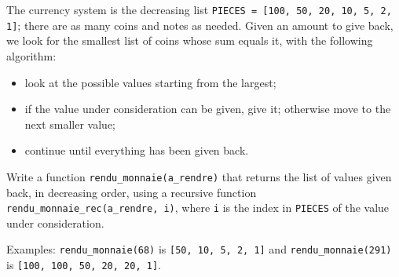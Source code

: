 The currency system is the decreasing list \texttt{PIECES = [100, 50, 20, 10, 5, 2, 1]}; there are as many coins and notes as needed. Given an amount to give back, we look for the smallest list of coins whose sum equals it, with the following algorithm:
\begin{itemize}
\item look at the possible values starting from the largest;
\item if the value under consideration can be given, give it; otherwise move to the next smaller value;
\item continue until everything has been given back.
\end{itemize}
Write a function \texttt{rendu\_monnaie(a\_rendre)} that returns the list of values given back, in decreasing order, using a recursive function \texttt{rendu\_monnaie\_rec(a\_rendre, i)}, where \texttt{i} is the index in \texttt{PIECES} of the value under consideration.

Examples: \texttt{rendu\_monnaie(68)} is \texttt{[50, 10, 5, 2, 1]} and \texttt{rendu\_monnaie(291)} is \texttt{[100, 100, 50, 20, 20, 1]}.
